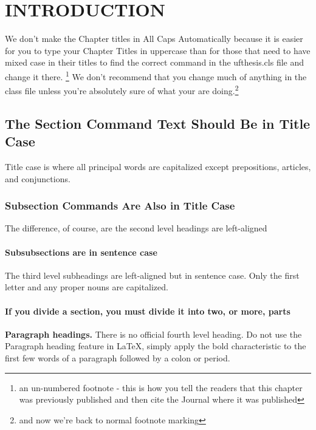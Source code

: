 \chapter{INTRODUCTION} \label{intro}

We don't make the Chapter titles in All Caps Automatically because it is easier for you to type your Chapter Titles in uppercase than for those that need to have mixed case in their titles to find the correct command in the ufthesis.cls file and change it there. \renewcommand*{\thefootnote}{\fnsymbol{footnote}}\footnote{an un-numbered footnote - this is how you tell the readers that this chapter was previously published and then cite the Journal where it was published} We don't recommend that you change much of anything in the class file unless you're absolutely sure of what your are doing.\renewcommand*{\thefootnote}{\arabic{footnote}}\setcounter{footnote}{0}\footnote{and now we're back to normal footnote marking}

\section{The Section Command Text Should Be in Title Case}

 Title case is where all principal words are capitalized except prepositions, articles, and conjunctions.  \cite{green2008wrinkle}

\subsection{Subsection Commands Are Also in Title Case}
The difference, of course, are the second level headings are left-aligned

\subsubsection{Subsubsections are in sentence case}
The third level subheadings are left-aligned but in sentence case. Only the first letter and any proper nouns are capitalized. \cite{strickler1998contamination}

\subsubsection{If you divide a section, you must divide it into two, or more, parts}

{\bf Paragraph headings.} There is no official fourth level heading. Do not use the Paragraph heading feature in LaTeX, simply apply the bold characteristic to the first few words of a paragraph followed by a colon or period.

